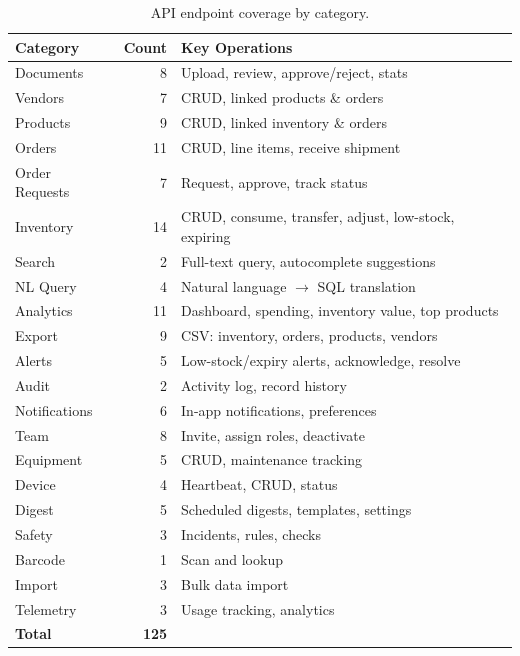 \documentclass[11pt]{article}
\begin{document}
\begin{table}[ht]
\centering
\caption{API endpoint coverage by category.}
\label{tab:endpoints}
\small
\begin{tabular}{lrl}
\toprule
\textbf{Category} & \textbf{Count} & \textbf{Key Operations} \\
\midrule
Documents     & 8  & Upload, review, approve/reject, stats \\
Vendors       & 7  & CRUD, linked products \& orders \\
Products      & 9  & CRUD, linked inventory \& orders \\
Orders        & 11 & CRUD, line items, receive shipment \\
Order Requests & 7 & Request, approve, track status \\
Inventory     & 14 & CRUD, consume, transfer, adjust, low-stock, expiring \\
Search        & 2  & Full-text query, autocomplete suggestions \\
NL Query      & 4  & Natural language $\to$ SQL translation \\
Analytics     & 11 & Dashboard, spending, inventory value, top products \\
Export        & 9  & CSV: inventory, orders, products, vendors \\
Alerts        & 5  & Low-stock/expiry alerts, acknowledge, resolve \\
Audit         & 2  & Activity log, record history \\
Notifications & 6  & In-app notifications, preferences \\
Team          & 8  & Invite, assign roles, deactivate \\
Equipment     & 5  & CRUD, maintenance tracking \\
Device        & 4  & Heartbeat, CRUD, status \\
Digest        & 5  & Scheduled digests, templates, settings \\
Safety        & 3  & Incidents, rules, checks \\
Barcode       & 1  & Scan and lookup \\
Import        & 3  & Bulk data import \\
Telemetry     & 3  & Usage tracking, analytics \\
\midrule
\textbf{Total} & \textbf{125} & \\
\bottomrule
\end{tabular}
\end{table}
\end{document}
